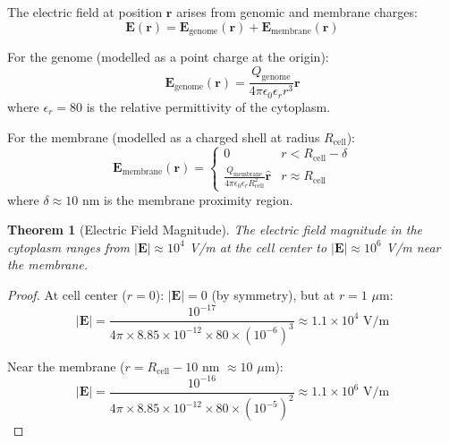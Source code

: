 \documentclass[11pt,twocolumn,a4paper]{article}
\newtheorem{theorem}{Theorem}[section]
\theoremstyle{definition}
\theoremstyle{remark}
\begin{document}
The electric field at position $\mathbf{r}$ arises from genomic and membrane charges:
\begin{equation}
\mathbf{E}(\mathbf{r}) = \mathbf{E}_{\mathrm{genome}}(\mathbf{r}) + \mathbf{E}_{\mathrm{membrane}}(\mathbf{r})
\label{eq:total_electric_field}
\end{equation}

For the genome (modelled as a point charge at the origin):
\begin{equation}
\mathbf{E}_{\mathrm{genome}}(\mathbf{r}) = \frac{Q_{\mathrm{genome}}}{4\pi\epsilon_0\epsilon_r r^3} \mathbf{r}
\label{eq:genome_field}
\end{equation}
where $\epsilon_r = 80$ is the relative permittivity of the cytoplasm.

For the membrane (modelled as a charged shell at radius $R_{\mathrm{cell}}$):
\begin{equation}
\mathbf{E}_{\mathrm{membrane}}(\mathbf{r}) = \begin{cases}
0 & r < R_{\mathrm{cell}} - \delta \\
\frac{Q_{\mathrm{membrane}}}{4\pi\epsilon_0\epsilon_r R_{\mathrm{cell}}^2} \hat{\mathbf{r}} & r \approx R_{\mathrm{cell}}
\end{cases}
\label{eq:membrane_field}
\end{equation}
where $\delta \approx 10$ nm is the membrane proximity region.

\begin{theorem}[Electric Field Magnitude]
\label{thm:field_magnitude}
The electric field magnitude in the cytoplasm ranges from $|\mathbf{E}| \approx 10^4$ V/m at the cell center to $|\mathbf{E}| \approx 10^6$ V/m near the membrane.
\end{theorem}

\begin{proof}
At cell center ($r = 0$): $|\mathbf{E}| = 0$ (by symmetry), but at $r = 1$ $\mu$m:
\begin{equation}
|\mathbf{E}| = \frac{10^{-17}}{4\pi \times 8.85 \times 10^{-12} \times 80 \times (10^{-6})^3} \approx 1.1 \times 10^4 \text{ V/m}
\end{equation}

Near the membrane ($r = R_{\mathrm{cell}} - 10$ nm $\approx 10$ $\mu$m):
\begin{equation}
|\mathbf{E}| = \frac{10^{-16}}{4\pi \times 8.85 \times 10^{-12} \times 80 \times (10^{-5})^2} \approx 1.1 \times 10^6 \text{ V/m}
\end{equation}
\end{proof}
\end{document}
